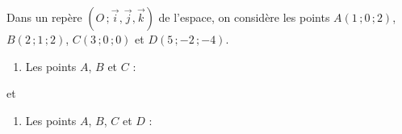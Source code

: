 \documentclass{cornouaille}
\begin{document}
\begin{QCM}
\begin{EnonceCommunQCM}
  Dans un repère
  $(O\,;\overrightarrow{i},\overrightarrow{j},\overrightarrow{k})$ de
  l'espace, on considère les points $A(1\,;0\,;2)$, $B(2\,;1\,;2)$,
  $C(3\,;0\,;0)$ et $D(5\,;-2\,;-4)$.
\end{EnonceCommunQCM}

\begin{GroupeQCM}
  \begin{enumerate}
\setcounter{enumi}{\value{questionqcm}}
\item 
    Les points $A$, $B$ et $C$ :
  \end{enumerate}
\begin{solution}
     et 
\end{solution}

  \begin{enumerate}
\setcounter{enumi}{\value{questionqcm}}
\item 
    Les points $A$, $B$, $C$ et $D$ :
  \end{enumerate}
\begin{solution}
\end{solution}


\end{GroupeQCM}
\end{QCM}
\end{document}
